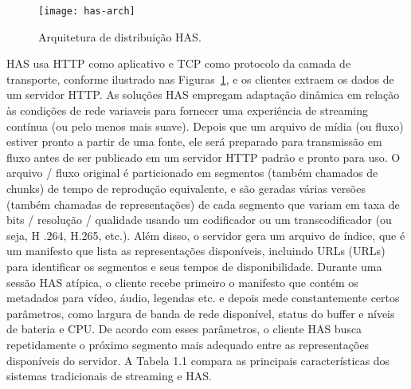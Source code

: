 \begin{figure}[htb]
  \centering
  \texttt{[image: has-arch]}
  \caption{Arquitetura de distribuição HAS.}
  \label{fig:has-arch}
\end{figure}


%


HAS usa HTTP como aplicativo e TCP como protocolo da camada de transporte, conforme ilustrado nas Figuras~\ref{fig:has-arch}, e os clientes extraem os dados de um servidor HTTP. As soluções HAS empregam adaptação dinâmica em relação às  condições de rede variaveis para fornecer uma experiência de streaming contínua (ou pelo menos mais suave). Depois  que um arquivo de mídia (ou fluxo) estiver pronto a partir de uma fonte, ele será preparado para transmissão em fluxo antes de ser publicado em um servidor HTTP padrão e pronto para uso. O arquivo / fluxo original é particionado em segmentos (também chamados de chunks) de tempo de reprodução equivalente, e são geradas várias versões (também chamadas de representações) de cada segmento que variam em taxa de bits / resolução / qualidade usando um codificador ou um transcodificador (ou seja, H .264, H.265, etc.). Além disso, o servidor gera um arquivo de índice, que é um manifesto que lista as representações disponíveis, incluindo URLs (URLs) para identificar os segmentos e seus tempos de disponibilidade. Durante uma sessão HAS atípica, o cliente recebe primeiro o manifesto que contém os metadados para vídeo, áudio, legendas etc. e depois mede constantemente certos parâmetros, como largura de banda de rede disponível, status do buffer e níveis de bateria e CPU. De acordo com esses parâmetros, o cliente HAS busca repetidamente o próximo segmento mais adequado entre as representações disponíveis do servidor. A Tabela 1.1 compara as principais características dos sistemas tradicionais de streaming e HAS.

